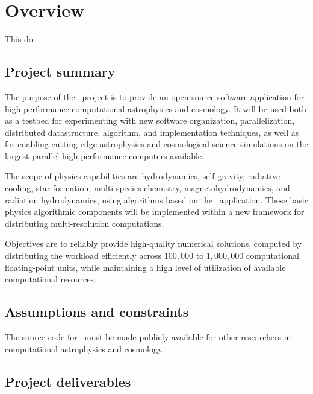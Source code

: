 \documentclass{article}[12pt]
\begin{document}

\section{Overview} \label{s:overview}

This do

\subsection{Project summary}

The purpose of the \cello\ project is to provide an open source
software application for high-performance computational astrophysics
and cosmology.  It will be used both as a testbed for experimenting
with new software organization, parallelization, distributed
datastructure, algorithm, and implementation techniques, as well as
for enabling cutting-edge astrophysics and cosmological science
simulations on the largest parallel high performance computers
available.

The scope of physics capabilities are hydrodynamics, self-gravity,
radiative cooling, star formation, multi-species chemistry,
magnetohydrodynamics, and radiation hydrodynamics, using algorithms
based on the \enzo\ application.  These basic physics algorithmic
components will be implemented within a new framework for distributing
multi-resolution computations.

Objectives are to reliably provide high-quality numerical solutions,
computed by distributing the workload efficiently across $100,000$ to
$1,000,000$ computational floating-point units, while maintaining a
high level of utilization of available computational resources.

\subsection{Assumptions and constraints}

The source code for \cello\ must be made publicly available for
other researchers in computational astrophysics and cosmology.

\subsection{Project deliverables}
\end{document}
